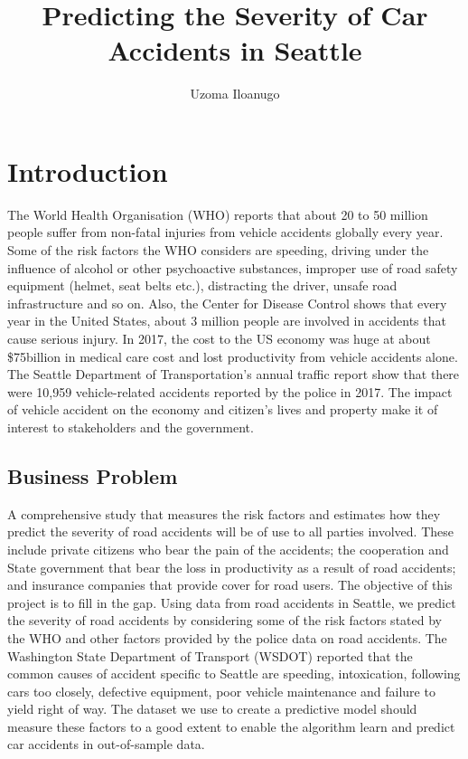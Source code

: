 \documentclass[a4paper,12pt]{article}
\author{Uzoma Iloanugo}
\title{Predicting the Severity of Car Accidents in Seattle}
\begin{document}
\maketitle

\section{Introduction}
The World Health Organisation (WHO) reports that about 20 to 50 million people suffer from non-fatal injuries from vehicle accidents globally every year. Some of the risk factors the WHO considers are speeding, driving under the influence of alcohol or other psychoactive substances, improper use of road safety equipment (helmet, seat belts etc.), distracting the driver, unsafe road infrastructure and so on. Also, the Center for Disease Control shows that every year in the United States, about 3 million people are involved in accidents that cause serious injury. In 2017, the cost to the US economy was huge at about \$75billion in medical care cost and lost productivity from vehicle accidents alone. The Seattle Department of Transportation’s annual traffic report show that there were 10,959 vehicle-related accidents reported by the police in 2017. The impact of vehicle accident on the economy and citizen's lives and property make it of interest to stakeholders and the government.

\subsection{Business Problem}
A comprehensive study that measures the risk factors and estimates how they predict the severity of road accidents will be of use to all parties involved. These include private citizens who bear the pain of the accidents; the cooperation and State government that bear the loss in productivity as a result of road accidents; and insurance companies that provide cover for road users. The objective of this project is to fill in the gap. Using data from road accidents in Seattle, we predict the severity of road accidents by considering some of the risk factors stated by the WHO and other factors provided by the police data on road accidents. The Washington State Department of Transport (WSDOT) reported that the common causes of accident specific to Seattle are speeding, intoxication, following cars too closely, defective equipment, poor vehicle maintenance and failure to yield right of way. The dataset we use to create a predictive model should measure these factors to a good extent to enable the algorithm learn and predict car accidents in out-of-sample data.\\
\end{document}
